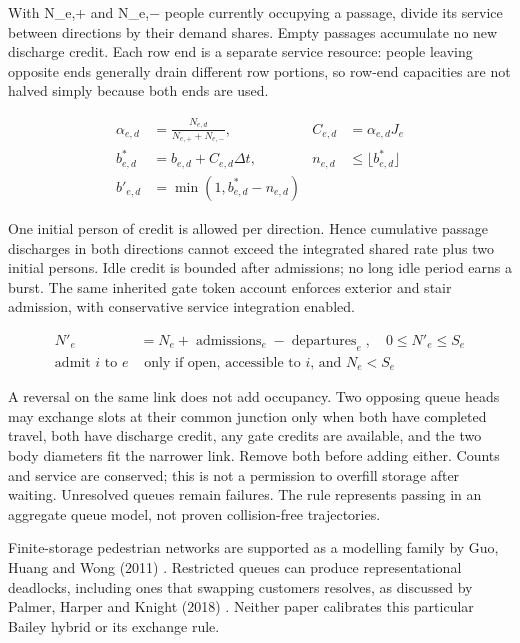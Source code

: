 \documentclass[11pt,a4paper]{article}
\begin{document}
With N\_e,+ and N\_e,\ensuremath{-} people currently occupying a passage, divide its service between directions by their demand shares. Empty passages accumulate no new discharge credit. Each row end is a separate service resource: people leaving opposite ends generally drain different row portions, so row-end capacities are not halved simply because both ends are used.


\begin{equation}
\begin{aligned}
\alpha_{e,d}&=\frac{N_{e,d}}{N_{e,+}+N_{e,-}}, & C_{e,d}&=\alpha_{e,d}J_e \\
b^*_{e,d}&=b_{e,d}+C_{e,d}\Delta t, & n_{e,d}&\le\lfloor b^*_{e,d}\rfloor \\
b'_{e,d}&=\min(1,b^*_{e,d}-n_{e,d})
\end{aligned}
\tag{L3}\label{eq:L3}
\end{equation}

One initial person of credit is allowed per direction. Hence cumulative passage discharges in both directions cannot exceed the integrated shared rate plus two initial persons. Idle credit is bounded after admissions; no long idle period earns a burst. The same inherited gate token account enforces exterior and stair admission, with conservative service integration enabled.


\begin{equation}
\begin{aligned}
N'_e&=N_e+\operatorname{admissions}_e-\operatorname{departures}_e,\quad0\le N'_e\le S_e \\
\text{admit }i\text{ to }e&\text{ only if open, accessible to }i\text{, and }N_e<S_e
\end{aligned}
\tag{L4}\label{eq:L4}
\end{equation}

A reversal on the same link does not add occupancy. Two opposing queue heads may exchange slots at their common junction only when both have completed travel, both have discharge credit, any gate credits are available, and the two body diameters fit the narrower link. Remove both before adding either. Counts and service are conserved; this is not a permission to overfill storage after waiting. Unresolved queues remain failures. The rule represents passing in an aggregate queue model, not proven collision-free trajectories.


Finite-storage pedestrian networks are supported as a modelling family by Guo, Huang and Wong (2011) \cite{L-R1}. Restricted queues can produce representational deadlocks, including ones that swapping customers resolves, as discussed by Palmer, Harper and Knight (2018) \cite{L-R2}. Neither paper calibrates this particular Bailey hybrid or its exchange rule.
\end{document}
